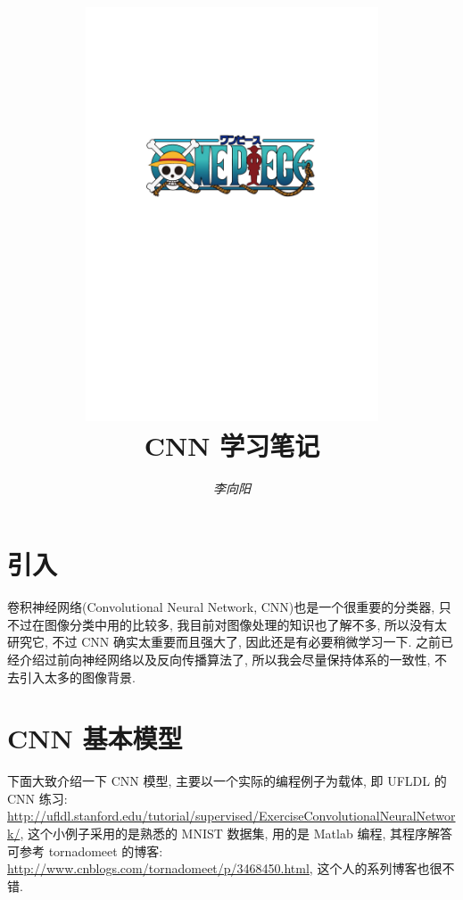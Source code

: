 \documentclass[a4paper,UTF8]{ctexart}
\theoremstyle{plain} \newtheorem{theorem}{定理}[section]
\theoremstyle{plain} \newtheorem{definition}{定义}[section]
\theoremstyle{plain} \newtheorem{lemma}{引理}[section]
\theoremstyle{plain} \newtheorem{proposition}{命题}[section]
\theoremstyle{plain} \newtheorem{example}{例}[section]
\theoremstyle{plain} \newtheorem{remark}{注}[section]
\theoremstyle{plain} \newtheorem{corollary}{推论}[section]
\begin{document}
\title{
\includegraphics[width=0.65\textwidth]{onepiece.pdf}\\
\vspace{2em}
\textbf{CNN 学习笔记}}
\author{\emph{李向阳}  }
\date{}


\maketitle
\thispagestyle{empty}

\newpage


\tableofcontents

\newpage

\section{引入}
卷积神经网络(Convolutional Neural Network, CNN)也是一个很重要的分类器, 只不过在图像分类中用的比较多, 我目前对图像处理的知识也了解不多, 所以没有太研究它, 不过 CNN 确实太重要而且强大了, 因此还是有必要稍微学习一下. 之前已经介绍过前向神经网络以及反向传播算法了, 所以我会尽量保持体系的一致性, 不去引入太多的图像背景.


\section{CNN 基本模型}
下面大致介绍一下 CNN 模型, 主要以一个实际的编程例子为载体, 即 UFLDL 的 CNN 练习: \url{http://ufldl.stanford.edu/tutorial/supervised/ExerciseConvolutionalNeuralNetwork/}, 这个小例子采用的是熟悉的 MNIST 数据集, 用的是 Matlab 编程, 其程序解答可参考 tornadomeet 的博客: \url{http://www.cnblogs.com/tornadomeet/p/3468450.html}, 这个人的系列博客也很不错. 
\end{document}
